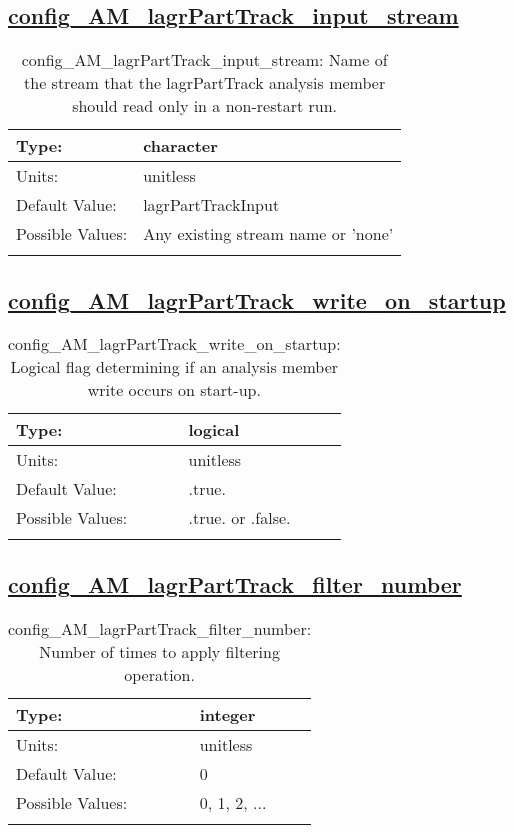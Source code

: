 \subsection[config\_AM\_lagrPartTrack\_input\_stream]{\hyperref[sec:nm_tab_AM_lagrPartTrack]{config\_AM\_lagrPartTrack\_input\_stream}}
\label{subsec:nm_sec_config_AM_lagrPartTrack_input_stream}
\begin{center}
\begin{longtable}{| p{2.0in} || p{4.0in} |}
    \hline
    Type: & character \\
    \hline
    Units: & \si{unitless} \\
    \hline
    Default Value: & lagrPartTrackInput \\
    \hline
    Possible Values: & Any existing stream name or 'none' \\
    \hline
    \caption{config\_AM\_lagrPartTrack\_input\_stream: Name of the stream that the lagrPartTrack analysis member should read only in a non-restart run.}
\end{longtable}
\end{center}
\subsection[config\_AM\_lagrPartTrack\_write\_on\_startup]{\hyperref[sec:nm_tab_AM_lagrPartTrack]{config\_AM\_lagrPartTrack\_write\_on\_startup}}
\label{subsec:nm_sec_config_AM_lagrPartTrack_write_on_startup}
\begin{center}
\begin{longtable}{| p{2.0in} || p{4.0in} |}
    \hline
    Type: & logical \\
    \hline
    Units: & \si{unitless} \\
    \hline
    Default Value: & .true. \\
    \hline
    Possible Values: & .true. or .false. \\
    \hline
    \caption{config\_AM\_lagrPartTrack\_write\_on\_startup: Logical flag determining if an analysis member write occurs on start-up.}
\end{longtable}
\end{center}
\subsection[config\_AM\_lagrPartTrack\_filter\_number]{\hyperref[sec:nm_tab_AM_lagrPartTrack]{config\_AM\_lagrPartTrack\_filter\_number}}
\label{subsec:nm_sec_config_AM_lagrPartTrack_filter_number}
\begin{center}
\begin{longtable}{| p{2.0in} || p{4.0in} |}
    \hline
    Type: & integer \\
    \hline
    Units: & \si{unitless} \\
    \hline
    Default Value: & 0 \\
    \hline
    Possible Values: & 0, 1, 2, ... \\
    \hline
    \caption{config\_AM\_lagrPartTrack\_filter\_number: Number of times to apply filtering operation.}
\end{longtable}
\end{center}
